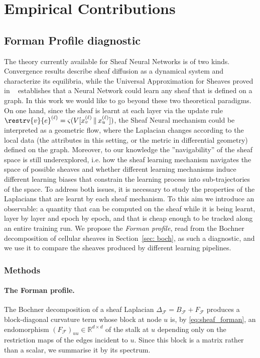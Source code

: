 \section{Empirical Contributions}
\label{sec:empirical_contributions}

\subsection{Forman Profile diagnostic}
\label{sec:forman_profile}


The theory currently available for Sheaf Neural Networks is of two kinds.
Convergence results describe sheaf diffusion as a dynamical system and characterize its equilibria, while the Universal Approximation for Sheaves proved in ~\cite{bodnar2022neural} establishes that a Neural Network could learn any sheaf that is defined on a graph.
In this work we would like to go beyond these two theoretical paradigms.
On one hand, since the sheaf is learnt at each layer via the update rule $\restrv{v}{e}^{(\ell)} = \varsigma(V[x_v^{(\ell)} \,\|\, x_u^{(\ell)}])$, the Sheaf Neural mechanism could be interpreted as a geometric flow, where the Laplacian changes according to the local data (the attributes in this setting, or the metric in differential geometry) defined on the graph.
Moreover, to our knowledge the ''navigability'' of the sheaf space is still underexplored, i.e. how the sheaf learning mechanism navigates the space of possible sheaves and whether different learning mechanisms induce different learning biases that constrain the learning process into sub-trajectories of the space.
To address both issues, it is necessary to study the properties of the Laplacians that are learnt by each sheaf mechanism.
To this aim we introduce an observable: a quantity that can be computed on the sheaf
while it is being learnt, layer by layer and epoch by epoch, and that is cheap
enough to be tracked along an entire training run. We propose the \emph{Forman
profile}, read from the Bochner decomposition of cellular sheaves in Section~\ref{sec: boch},
as such a diagnostic, and we use it to compare the sheaves produced by
different learning pipelines.

\subsubsection{Methods}
\paragraph{The Forman profile.}
The Bochner decomposition of a sheaf Laplacian
$\Delta_{\mathcal{F}} = B_{\mathcal{F}} + F_{\mathcal{F}}$ produces a
block-diagonal curvature term whose block at node $u$ is, by
\eqref{eq:sheaf_forman}, an endomorphism
$(F_{\mathcal{F}})_{uu} \in \mathbb{R}^{d\times d}$ of the stalk at $u$
depending only on the restriction maps of the edges incident to $u$. Since this
block is a matrix rather than a scalar, we summarise it by its spectrum.


